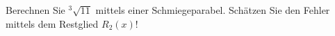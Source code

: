 \item 
Berechnen Sie $^3\sqrt{11}$ mittels einer Schmiegeparabel. Schätzen Sie den Fehler mittels dem Restglied $R_2(x)$!

